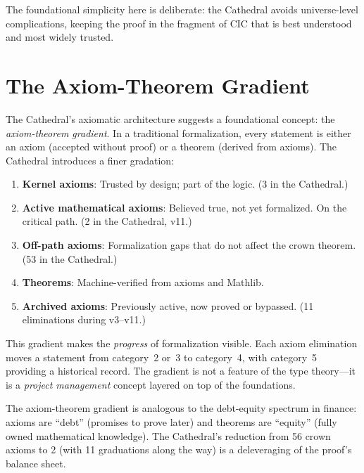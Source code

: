 \documentclass[11pt,a4paper]{article}
\begin{document}
The foundational simplicity here is deliberate: the Cathedral avoids
universe-level complications, keeping the proof in the fragment of
CIC that is best understood and most widely trusted.

\section{The Axiom-Theorem Gradient}
\label{sec:gradient}

The Cathedral's axiomatic architecture suggests a foundational
concept: the \emph{axiom-theorem gradient}. In a traditional
formalization, every statement is either an axiom (accepted without
proof) or a theorem (derived from axioms). The Cathedral introduces
a finer gradation:

\begin{enumerate}
  \item \textbf{Kernel axioms}: Trusted by design; part of the logic.
    (3 in the Cathedral.)
  \item \textbf{Active mathematical axioms}: Believed true, not yet
    formalized. On the critical path. (2 in the Cathedral, v11.)
  \item \textbf{Off-path axioms}: Formalization gaps that do not
    affect the crown theorem. (53 in the Cathedral.)
  \item \textbf{Theorems}: Machine-verified from axioms and Mathlib.
  \item \textbf{Archived axioms}: Previously active, now proved or
    bypassed. (11 eliminations during v3--v11.)
\end{enumerate}

This gradient makes the \emph{progress} of formalization visible.
Each axiom elimination moves a statement from category~2 or~3 to
category~4, with category~5 providing a historical record. The
gradient is not a feature of the type theory---it is a \emph{project
management} concept layered on top of the foundations.

\begin{remark}
The axiom-theorem gradient is analogous to the debt-equity spectrum
in finance: axioms are ``debt'' (promises to prove later) and theorems
are ``equity'' (fully owned mathematical knowledge). The Cathedral's
reduction from 56 crown axioms to 2 (with 11 graduations along the way)
is a deleveraging of the proof's balance sheet.
\end{remark}
\end{document}
